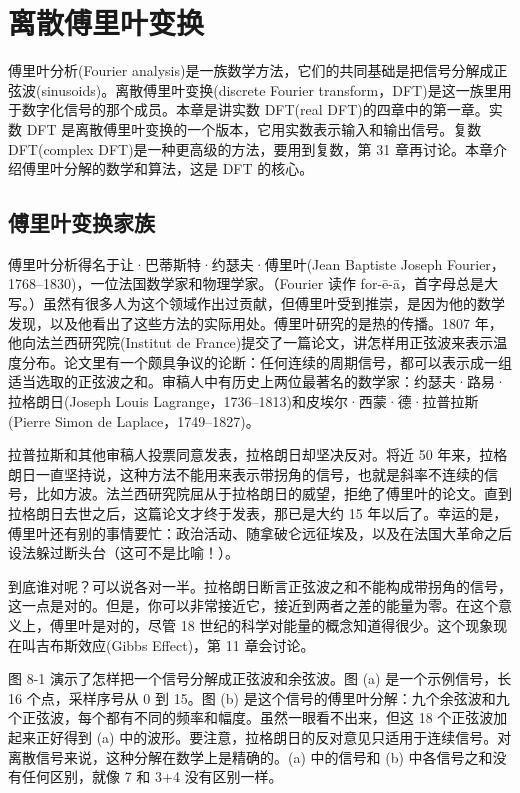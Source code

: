 
\chapter{离散傅里叶变换}\label{ch-08}

傅里叶分析(Fourier
analysis)是一族数学方法，它们的共同基础是把信号分解成正弦波(sinusoids)。离散傅里叶变换(discrete
Fourier transform，DFT)是这一族里用于数字化信号的那个成员。本章是讲实数
DFT(real DFT)的四章中的第一章。实数 DFT
是离散傅里叶变换的一个版本，它用实数表示输入和输出信号。复数 DFT(complex
DFT)是一种更高级的方法，要用到复数，第 31
章再讨论。本章介绍傅里叶分解的数学和算法，这是 DFT 的核心。

\section{傅里叶变换家族}

傅里叶分析得名于让·巴蒂斯特·约瑟夫·傅里叶(Jean Baptiste Joseph
Fourier，1768--1830)，一位法国数学家和物理学家。（Fourier 读作
for-ē-ā，首字母总是大写。）虽然有很多人为这个领域作出过贡献，但傅里叶受到推崇，是因为他的数学发现，以及他看出了这些方法的实际用处。傅里叶研究的是热的传播。1807
年，他向法兰西研究院(Institut de
France)提交了一篇论文，讲怎样用正弦波来表示温度分布。论文里有一个颇具争议的论断：任何连续的周期信号，都可以表示成一组适当选取的正弦波之和。审稿人中有历史上两位最著名的数学家：约瑟夫·路易·拉格朗日(Joseph
Louis Lagrange，1736--1813)和皮埃尔·西蒙·德·拉普拉斯(Pierre Simon de
Laplace，1749--1827)。

拉普拉斯和其他审稿人投票同意发表，拉格朗日却坚决反对。将近 50
年来，拉格朗日一直坚持说，这种方法不能用来表示带拐角的信号，也就是斜率不连续的信号，比如方波。法兰西研究院屈从于拉格朗日的威望，拒绝了傅里叶的论文。直到拉格朗日去世之后，这篇论文才终于发表，那已是大约
15
年以后了。幸运的是，傅里叶还有别的事情要忙：政治活动、随拿破仑远征埃及，以及在法国大革命之后设法躲过断头台（这可不是比喻！）。

到底谁对呢？可以说各对一半。拉格朗日断言正弦波之和不能构成带拐角的信号，这一点是对的。但是，你可以非常接近它，接近到两者之差的能量为零。在这个意义上，傅里叶是对的，尽管
18 世纪的科学对能量的概念知道得很少。这个现象现在叫吉布斯效应(Gibbs
Effect)，第 11 章会讨论。

图 8-1 演示了怎样把一个信号分解成正弦波和余弦波。图 (a)
是一个示例信号，长 16 个点，采样序号从 0 到 15。图 (b)
是这个信号的傅里叶分解：九个余弦波和九个正弦波，每个都有不同的频率和幅度。虽然一眼看不出来，但这
18 个正弦波加起来正好得到 (a)
中的波形。要注意，拉格朗日的反对意见只适用于连续信号。对离散信号来说，这种分解在数学上是精确的。(a)
中的信号和 (b) 中各信号之和没有任何区别，就像 7 和 3+4 没有区别一样。

